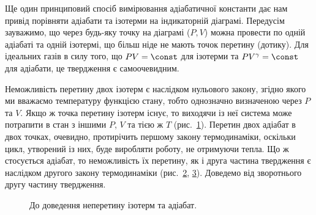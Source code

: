 Ще один принциповий спосіб вимірювання адіабатичної константи дає нам привід порівняти
адіабати та ізотерми на індикаторній діаграмі. Передусім зауважимо, що через будь-яку точку
на діаграмі ($P,V$) можна провести по одній адіабаті та одній ізотермі, що більш ніде не
мають точок перетину (дотику). Для ідеальних газів в силу того, що $PV = \const$ для
ізотерми та $PV^{\gamma} = \const$ для адіабати, це твердження є самоочевидним.

Неможливість перетину двох ізотерм є наслідком нульового закону, згідно якого ми вважаємо
температуру функцією стану, тобто однозначно визначеною через $P$ та $V$. Якщо ж точка
перетину ізотерм існує, то виходячи із неї система може потрапити в стан з іншими $P$, $V$
та тією ж $T$ (рис.~\ref{tikz:Pic2.10a}). Перетин двох адіабат в двох точках, очевидно,
протирічить першому закону термодинаміки, оскільки цикл, утворений із них, буде виробляти
роботу, не отримуючи тепла. Що ж стосується адіабат, то неможливість їх перетину, як і
друга частина твердження є наслідком другого закону термодинаміки (рис.~\ref{tikz:Pic2.10b},
\ref{tikz:Pic2.10c}).
Доведемо від зворотнього другу частину твердження.

\begin{figure}[!h]
	\centering
	\begin{subfigure}[b]{0.45\textwidth}\centering
		
		\caption{}
        \label{tikz:Pic2.10a}
	\end{subfigure}
	\begin{subfigure}[b]{0.45\textwidth}\centering
		
		\caption{}
		\label{tikz:Pic2.10b}
	\end{subfigure}

	\begin{subfigure}[b]{0.45\textwidth}\centering
		
		\caption{}
		\label{tikz:Pic2.10c}
	\end{subfigure}
	\begin{subfigure}[b]{0.45\textwidth}\centering
		
		\caption{}
		\label{tikz:Pic2.10d}
	\end{subfigure}
	\caption{До доведення неперетину ізотерм та адіабат.}
	\label{pic:Pic2.10}
\end{figure}



